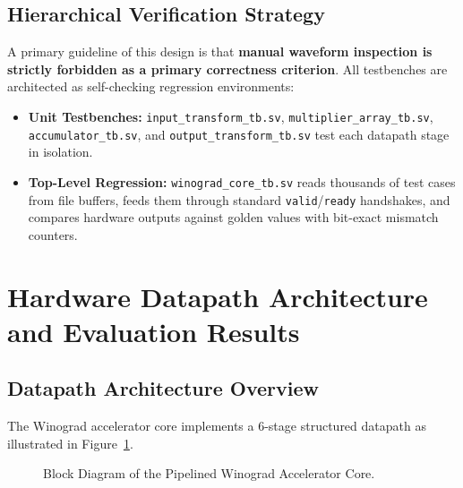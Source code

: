 \documentclass[12pt,a4paper]{article}
\begin{document}
\subsection{Hierarchical Verification Strategy}
A primary guideline of this design is that \textbf{manual waveform inspection is strictly forbidden as a primary correctness criterion}. All testbenches are architected as self-checking regression environments:
\begin{itemize}
    \item \textbf{Unit Testbenches:} \texttt{input\_transform\_tb.sv}, \texttt{multiplier\_array\_tb.sv}, \texttt{accumulator\_tb.sv}, and \texttt{output\_transform\_tb.sv} test each datapath stage in isolation.
    \item \textbf{Top-Level Regression:} \texttt{winograd\_core\_tb.sv} reads thousands of test cases from file buffers, feeds them through standard \texttt{valid}/\texttt{ready} handshakes, and compares hardware outputs against golden values with bit-exact mismatch counters.
\end{itemize}

\section{Hardware Datapath Architecture and Evaluation Results}

\subsection{Datapath Architecture Overview}
The Winograd accelerator core implements a 6-stage structured datapath as illustrated in Figure~\ref{fig:datapath_block}.
\begin{figure}[htbp]
    \centering
    \caption{Block Diagram of the Pipelined Winograd Accelerator Core.}
    \label{fig:datapath_block}
\end{figure}
\end{document}
